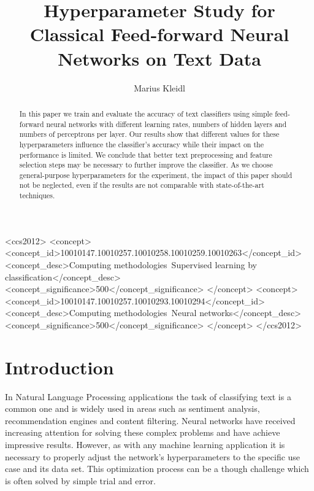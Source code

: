 \documentclass[sigconf]{acmart}
\begin{document}
\title{Hyperparameter Study for Classical Feed-forward Neural Networks on Text Data}

\author{Marius Kleidl}

\begin{abstract}
	In this paper we train and evaluate the accuracy of text classifiers using simple feed-forward neural networks with different learning rates, numbers of hidden layers and numbers of perceptrons per layer. Our results show that different values for these hyperparameters influence the classifier's accuracy while their impact on the performance is limited. We conclude that better text preprocessing and feature selection steps may be necessary to further improve the classifier. As we choose general-purpose hyperparameters for the experiment, the impact of this paper should not be neglected, even if the results are not comparable with state-of-the-art techniques.
\end{abstract}

%
%
\begin{CCSXML}
	<ccs2012>
	<concept>
	<concept_id>10010147.10010257.10010258.10010259.10010263</concept_id>
	<concept_desc>Computing methodologies~Supervised learning by classification</concept_desc>
	<concept_significance>500</concept_significance>
	</concept>
	<concept>
	<concept_id>10010147.10010257.10010293.10010294</concept_id>
	<concept_desc>Computing methodologies~Neural networks</concept_desc>
	<concept_significance>500</concept_significance>
	</concept>
	</ccs2012>
\end{CCSXML}



\maketitle

\section{Introduction}

In Natural Language Processing applications the task of classifying text is a common one and is widely used in areas such as sentiment analysis, recommendation engines and content filtering. Neural networks have received increasing attention for solving these complex problems and have achieve impressive results. However, as with any machine learning application it is necessary to properly adjust the network's hyperparameters to the specific use case and its data set. This optimization process can be a though challenge which is often solved by simple trial and error.
\end{document}
